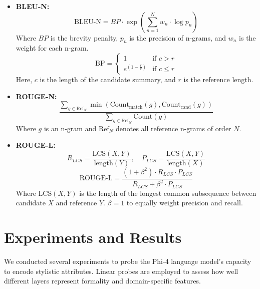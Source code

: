 \documentclass[twocolumn]{article}
\begin{document}
\begin{itemize}
    \item \textbf{BLEU-N:}
        \begin{equation}
            \text{BLEU-N} = BP \cdot \exp\left(\sum_{n=1}^{N} w_n \cdot \log p_n\right)
        \end{equation}
        Where $BP$ is the brevity penalty, $p_n$ is the precision of n-grams, and $w_n$ is the weight for each n-gram.
        \begin{equation}
            \text{BP} =
            \begin{cases}
                1 & \text{if } c > r \\
                e^{(1 - \frac{r}{c})} & \text{if } c \leq r
            \end{cases}
        \end{equation}
        Here, $c$ is the length of the candidate summary, and $r$ is the reference length.
    \item \textbf{ROUGE-N:}
        \small
            \begin{equation}
                \frac{
                \sum_{g \in \text{Ref}_N} \min\left(\text{Count}_{\text{match}}(g), \text{Count}_{\text{cand}}(g)\right)
                }{
                \sum_{g \in \text{Ref}_N} \text{Count}(g)
                }
            \end{equation}
        \normalsize
        Where $g$ is an n-gram and $\text{Ref}_N$ denotes all reference n-grams of order $N$.            
    \item \textbf{ROUGE-L:}
        \begin{equation}
        R_{LCS} = \frac{\text{LCS}(X, Y)}{\text{length}(Y)}, \quad
        P_{LCS} = \frac{\text{LCS}(X, Y)}{\text{length}(X)}
        \end{equation}
        \begin{equation}
        \text{ROUGE-L} = \frac{(1 + \beta^2) \cdot R_{LCS} \cdot P_{LCS}}{R_{LCS} + \beta^2 \cdot P_{LCS}}
        \end{equation}
        Where $\text{LCS}(X, Y)$ is the length of the longest common subsequence between candidate $X$ and reference $Y$. $\beta = 1$ to equally weight precision and recall.
\end{itemize}

\section{Experiments and Results}
We conducted several experiments to probe the Phi-4 language model's capacity to encode stylistic attributes. Linear probes are employed to assess how well different layers represent formality and domain-specific features.
\end{document}
